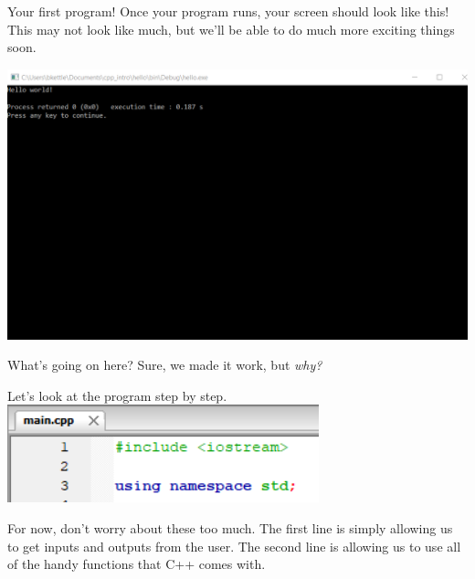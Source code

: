 \documentclass{beamer}
\begin{document}
\begin{frame}{Your first program!}
Once your program runs, your screen should look like this! This may not look like much, but we'll be able to do much more exciting things soon.

\includegraphics[scale=.4]{codeblockssetup9.png}
    
\end{frame}

\begin{frame}{What's going on here?}
Sure, we made it work, but \textit{why?}

Let's look at the program step by step.
\includegraphics[scale=1]{cpp1.png}

For now, don't worry about these too much. The first line is simply allowing us to get inputs and outputs from the user. The second line is allowing us to use all of the handy functions that C++ comes with.

\end{frame}
\end{document}
